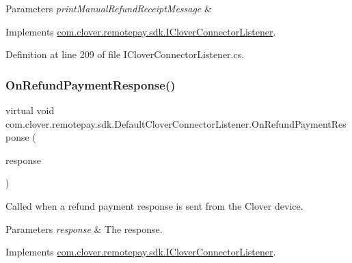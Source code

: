 \begin{DoxyParams}{Parameters}
{\em print\+Manual\+Refund\+Receipt\+Message} & \\
\hline
\end{DoxyParams}


Implements \hyperlink{interfacecom_1_1clover_1_1remotepay_1_1sdk_1_1_i_clover_connector_listener_af4bbb0ceeab318ef482f0e90506d36b0}{com.\+clover.\+remotepay.\+sdk.\+I\+Clover\+Connector\+Listener}.



Definition at line 209 of file I\+Clover\+Connector\+Listener.\+cs.

\mbox{\label{classcom_1_1clover_1_1remotepay_1_1sdk_1_1_default_clover_connector_listener_a9129ed4160946b687461c962c7af8e93}} 
\subsubsection{\texorpdfstring{On\+Refund\+Payment\+Response()}{OnRefundPaymentResponse()}}
{\footnotesize\ttfamily virtual void com.\+clover.\+remotepay.\+sdk.\+Default\+Clover\+Connector\+Listener.\+On\+Refund\+Payment\+Response (\begin{DoxyParamCaption}\item[{\hyperlink{classcom_1_1clover_1_1remotepay_1_1sdk_1_1_refund_payment_response}{Refund\+Payment\+Response}}]{response }\end{DoxyParamCaption})\hspace{0.3cm}{\ttfamily [virtual]}}



Called when a refund payment response is sent from the Clover device. 


\begin{DoxyParams}{Parameters}
{\em response} & The response.\\
\hline
\end{DoxyParams}


Implements \hyperlink{interfacecom_1_1clover_1_1remotepay_1_1sdk_1_1_i_clover_connector_listener_a587ba1b1dfd1201e9225c7bc6323ad45}{com.\+clover.\+remotepay.\+sdk.\+I\+Clover\+Connector\+Listener}.



